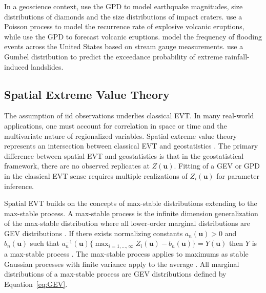 In a geoscience context, \cite{caers1999statistics,caers1999statisticsa} use the \gls{GPD} to model earthquake magnitudes, size distributions of diamonds and the size distributions of impact craters. \cite{deligne2010recurrence} use a Poisson process to model the recurrence rate of explosive volcanic eruptions, while \cite{nguyen2023dynamic} use the \gls{GPD} to forecast volcanic eruptions. \cite{miniussi2020metastatistical} model the frequency of flooding events across the United States based on stream gauge measurements. \cite{lee2021temporal} use a Gumbel distribution to predict the exceedance probability of extreme rainfall-induced landslides.

\subsection{Spatial Extreme Value Theory}
\label{subsec:01spevt}

The assumption of \acrfull{iid} observations underlies classical \gls{EVT}. In many real-world applications, one must account for correlation in space or time and the multivariate nature of regionalized variables. Spatial extreme value theory represents an intersection between classical \gls{EVT} and geostatistics \citep{neves2015geostatistical}. The primary difference between spatial \gls{EVT} and geostatistics is that in the geostatistical framework, there are no observed replicates at $Z(\mathbf{u})$. Fitting of a \gls{GEV} or \gls{GPD} in the classical \gls{EVT} sense requires multiple realizations of $Z_i(\mathbf{u})$ for parameter inference.

Spatial \gls{EVT} builds on the concepts of max-stable distributions extending to the max-stable process. A max-stable process is the infinite dimension generalization of the max-stable distribution where all lower-order marginal distributions are \gls{GEV} distributions \citep{schlather2003dependence}. If there exists normalizing constants $a_n(\mathbf{u}) > 0$ and $b_n(\mathbf{u})$ such that $a_n^{-1}(\mathbf{u})\{\max_{i=1,...,\infty} Z_i(\mathbf{u}) - b_n(\mathbf{u})\} = Y(\mathbf{u})$ then $Y$ is a max-stable process \citep{dehaan2007extreme}. The max-stable process applies to maximums as stable Gaussian processes with finite variance apply to the average \citep{chiles2012geostatistics}. All marginal distributions of a max-stable process are \gls{GEV} distributions defined by Equation~\ref{eq:GEV}.

